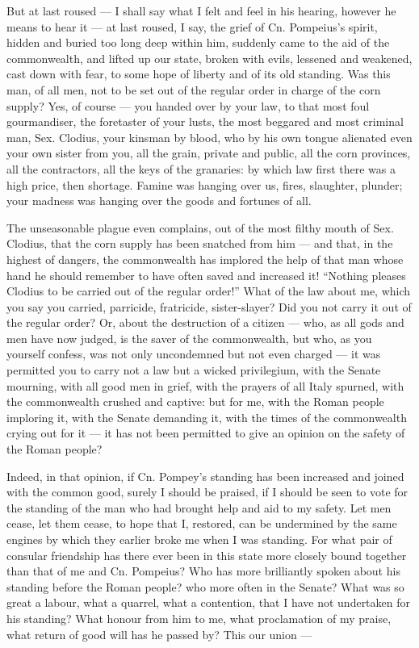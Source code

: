  But at last roused --- I shall say what I felt and feel in his hearing, however he means to hear it --- at last roused, I say, the grief of Cn. Pompeius's spirit, hidden and buried too long deep within him, suddenly came to the aid of the commonwealth, and lifted up our state, broken with evils, lessened and weakened, cast down with fear, to some hope of liberty and of its old standing. Was this man, of all men, not to be set out of the regular order in charge of the corn supply? Yes, of course --- you handed over by your law, to that most foul gourmandiser, the foretaster of your lusts, the most beggared and most criminal man, Sex. Clodius, your kinsman by blood, who by his own tongue alienated even your own sister from you, all the grain, private and public, all the corn provinces, all the contractors, all the keys of the granaries: by which law first there was a high price, then shortage. Famine was hanging over us, fires, slaughter, plunder; your madness was hanging over the goods and fortunes of all.

 The unseasonable plague even complains, out of the most filthy mouth of Sex. Clodius, that the corn supply has been snatched from him --- and that, in the highest of dangers, the commonwealth has implored the help of that man whose hand he should remember to have often saved and increased it! ``Nothing pleases Clodius to be carried out of the regular order!'' What of the law about me, which you say you carried, parricide, fratricide, sister-slayer? Did you not carry it out of the regular order? Or, about the destruction of a citizen --- who, as all gods and men have now judged, is the saver of the commonwealth, but who, as you yourself confess, was not only uncondemned but not even charged --- it was permitted you to carry not a law but a wicked privilegium, with the Senate mourning, with all good men in grief, with the prayers of all Italy spurned, with the commonwealth crushed and captive: but for me, with the Roman people imploring it, with the Senate demanding it, with the times of the commonwealth crying out for it --- it has not been permitted to give an opinion on the safety of the Roman people?

 Indeed, in that opinion, if Cn. Pompey's standing has been increased and joined with the common good, surely I should be praised, if I should be seen to vote for the standing of the man who had brought help and aid to my safety. Let men cease, let them cease, to hope that I, restored, can be undermined by the same engines by which they earlier broke me when I was standing. For what pair of consular friendship has there ever been in this state more closely bound together than that of me and Cn. Pompeius? Who has more brilliantly spoken about his standing before the Roman people? who more often in the Senate? What was so great a labour, what a quarrel, what a contention, that I have not undertaken for his standing? What honour from him to me, what proclamation of my praise, what return of good will has he passed by? This our union ---

